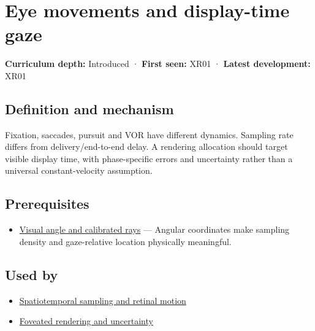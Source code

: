 \hypertarget{appendix-a6f2c4fe1996}{}\label{referencestart:appendix-a6f2c4fe1996}
\section{Eye movements and display-time gaze}\label{appendix-a6f2c4fe1996-eye-movements-and-display-time-gaze}

\textbf{Curriculum depth:} Introduced · \textbf{First seen:} XR01 · \textbf{Latest development:} XR01

\begin{allmightroledefinition}

\subsection{Definition and mechanism}\label{appendix-a6f2c4fe1996-definition-and-mechanism}

Fixation, saccades, pursuit and VOR have different dynamics. Sampling rate differs from delivery/end-to-end delay. A rendering allocation should target visible display time, with phase-specific errors and uncertainty rather than a universal constant-velocity assumption.

\end{allmightroledefinition}

\subsection{Prerequisites}\label{appendix-a6f2c4fe1996-prerequisites}

\begin{itemize}
\tightlist
\item
  \hyperref[appendix-7d356c396d1a]{Visual angle and calibrated rays} --- Angular coordinates make sampling density and gaze-relative location physically meaningful.
\end{itemize}

\subsection{Used by}\label{appendix-a6f2c4fe1996-used-by}

\begin{itemize}
\tightlist
\item
  \hyperref[appendix-70895739febb]{Spatiotemporal sampling and retinal motion}
\item
  \hyperref[appendix-5878b813b732]{Foveated rendering and uncertainty}
\end{itemize}

